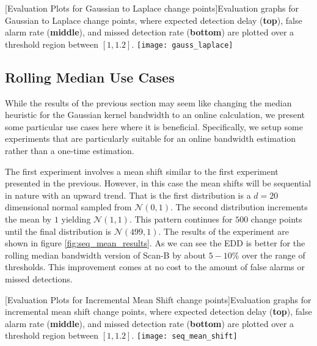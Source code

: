 \begin{minipage}{\textwidth}
\begin{center} 
[Evaluation Plots for Gaussian to Laplace change points]{Evaluation graphs for Gaussian to Laplace change points, where expected detection delay (\textbf{top}), false alarm rate (\textbf{middle}), and missed detection rate (\textbf{bottom}) are plotted over a threshold region between $[1,1.2]$. } 
\texttt{[image: gauss\_laplace]} 
\label{fig:gauss_laplace_results} 
\end{center}
\end{minipage}

\subsection{Rolling Median Use Cases}

While the results of the previous section may seem like changing the median heuristic for the Gaussian kernel bandwidth to an online calculation, we present some particular use cases here where it is beneficial. Specifically, we setup some experiments that are particularly suitable for an online bandwidth estimation rather than a one-time estimation.

The first experiment involves a mean shift similar to the first experiment presented in the previous. However, in this case the mean shifts will be sequential in nature with an upward trend. That is the first distribution is a $d=20$ dimensional normal sampled from $\mathcal{N}(0,1)$. The second distribution increments the mean by $1$ yielding $\mathcal{N}(1,1)$. This pattern continues for $500$ change points until the final distribution is $\mathcal{N}(499,1)$. The results of the experiment are shown in figure \ref{fig:seq_mean_results}. As we can see the EDD is better for the rolling median bandwidth version of Scan-B by about $5-10\%$ over the range of thresholds. This improvement comes at no cost to the amount of false alarms or missed detections.

\begin{center} 
[Evaluation Plots for Incremental Mean Shift change points]{Evaluation graphs for incremental mean shift change points, where expected detection delay (\textbf{top}), false alarm rate (\textbf{middle}), and missed detection rate (\textbf{bottom}) are plotted over a threshold region between $[1,1.2]$. } 
\texttt{[image: seq\_mean\_shift]} 
\label{fig:seq_mean_results} 
\end{center}
